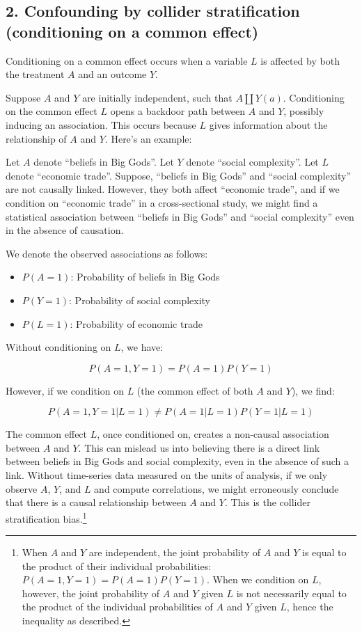 \documentclass[
  singlecolumn]{report}
\providecommand{\tightlist}{%
  \setlength{\itemsep}{0pt}\setlength{\parskip}{0pt}}\usepackage{longtable,booktabs,array}
\begin{document}
\hypertarget{confounding-by-collider-stratification-conditioning-on-a-common-effect}{%
\subsection{2. Confounding by collider stratification (conditioning on a
common
effect)}\label{confounding-by-collider-stratification-conditioning-on-a-common-effect}}

Conditioning on a common effect occurs when a variable \(L\) is affected
by both the treatment \(A\) and an outcome \(Y\).

Suppose \(A\) and \(Y\) are initially independent, such that
\(A \coprod Y(a)\). Conditioning on the common effect \(L\) opens a
backdoor path between \(A\) and \(Y\), possibly inducing an association.
This occurs because \(L\) gives information about the relationship of
\(A\) and \(Y\). Here's an example:

Let \(A\) denote ``beliefs in Big Gods''. Let \(Y\) denote ``social
complexity''. Let \(L\) denote ``economic trade''. Suppose, ``beliefs in
Big Gods'' and ``social complexity'' are not causally linked. However,
they both affect ``economic trade'', and if we condition on ``economic
trade'' in a cross-sectional study, we might find a statistical
association between ``beliefs in Big Gods'' and ``social complexity''
even in the absence of causation.

We denote the observed associations as follows:

\begin{itemize}
\tightlist
\item
  \(P(A = 1)\): Probability of beliefs in Big Gods
\item
  \(P(Y = 1)\): Probability of social complexity
\item
  \(P(L = 1)\): Probability of economic trade
\end{itemize}

Without conditioning on \(L\), we have:

\[P(A = 1, Y = 1) = P(A = 1)P(Y = 1)\]

However, if we condition on \(L\) (the common effect of both \(A\) and
\(Y\)), we find:

\[P(A = 1, Y = 1 | L = 1) \neq P(A = 1 | L = 1)P(Y = 1 | L = 1)\]

The common effect \(L\), once conditioned on, creates a non-causal
association between \(A\) and \(Y\). This can mislead us into believing
there is a direct link between beliefs in Big Gods and social
complexity, even in the absence of such a link. Without time-series data
measured on the units of analysis, if we only observe \(A\), \(Y\), and
\(L\) and compute correlations, we might erroneously conclude that there
is a causal relationship between \(A\) and \(Y\). This is the collider
stratification bias.\footnote{When \(A\) and \(Y\) are independent, the
  joint probability of \(A\) and \(Y\) is equal to the product of their
  individual probabilities: \(P(A = 1, Y = 1) = P(A = 1)P(Y = 1)\). When
  we condition on \(L\), however, the joint probability of \(A\) and
  \(Y\) given \(L\) is not necessarily equal to the product of the
  individual probabilities of \(A\) and \(Y\) given \(L\), hence the
  inequality as described.}
\end{document}
